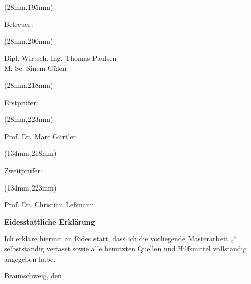 \begin{titlepage}
\begin{doublespace}
\begin{textblock*}{20mm}(28mm,195mm)
\raggedright
    Betreuer:
\end{textblock*}

\begin{textblock*}{80mm}(28mm,200mm)
\raggedright
    Dipl.-Wirtsch.-Ing. Thomas Paulsen\\\vspace{-8pt}M. Sc. Sinem Gülen
\end{textblock*}



\begin{textblock*}{38mm}(28mm,218mm)
\raggedright
    Erstprüfer:
\end{textblock*}

\begin{textblock*}{38mm}(28mm,223mm)
\raggedright
    Prof. Dr. Marc Gürtler
\end{textblock*}



\begin{textblock*}{48mm}(134mm,218mm)
\raggedright
    Zweitprüfer:
\end{textblock*}

\begin{textblock*}{48mm}(134mm,223mm)
\raggedright
    Prof. Dr. Christian Leßmann
\end{textblock*}


\end{doublespace}
\end{titlepage}
\blankpage


\newpage

\setcounter{page}{4}

{\LARGE \textbf{Eidesstattliche Erklärung}}\\ \vspace{1cm}

Ich erkläre hiermit an Eides statt, dass ich die vorliegende  Masterarbeit „\titel“ selbstständig verfasst sowie alle benutzten Quellen und Hilfsmittel vollständig angegeben habe.\\ \vspace{1cm}

Braunschweig, den \abgabedatum\\ \vspace{1cm}

\name
